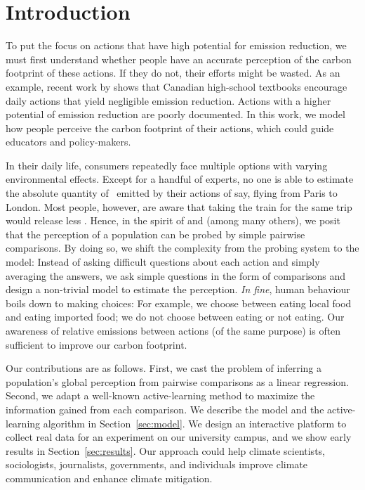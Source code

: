 \section{Introduction}
\label{sec:introduction}
To put the focus on actions that have high potential for emission reduction, we must first understand whether people have an accurate perception of the carbon footprint of these actions.
If they do not, their efforts might be wasted.
As an example, recent work by \citet{wynes2017climate} shows that Canadian high-school textbooks encourage daily actions that yield negligible emission reduction.
Actions with a higher potential of emission reduction are poorly documented.
In this work, we model how people perceive the carbon footprint of their actions, which could guide educators and policy-makers.

In their daily life, consumers repeatedly face multiple options with varying environmental effects.
Except for a handful of experts, no one is able to estimate the absolute quantity of \COtwo\ emitted by their actions of say, flying from Paris to London.
Most people, however, are aware that taking the train for the same trip would release less \COtwo.
Hence, in the spirit of \citet{thurstone1927method} and \citet{salganik2015wiki} (among many others), we posit that the perception of a population can be probed by simple pairwise comparisons.
By doing so, we shift the complexity from the probing system to the model: Instead of asking difficult questions about each action and simply averaging the answers, we ask simple questions in the form of comparisons and design a non-trivial model to estimate the perception.
\textit{In fine}, human behaviour boils down to making choices: For example, we choose between eating local food and eating imported food; we do not choose between eating or not eating.
Our awareness of relative emissions between actions (of the same purpose) is often sufficient to improve our carbon footprint.

Our contributions are as follows.
First, we cast the problem of inferring a population's global perception from pairwise comparisons as a linear regression.
Second, we adapt a well-known active-learning method to maximize the information gained from each comparison.
We describe the model and the active-learning algorithm in Section~\ref{sec:model}.
We design an interactive platform to collect real data for an experiment on our university campus, and we show early results in Section~\ref{sec:results}.
Our approach could help climate scientists, sociologists, journalists, governments, and individuals improve climate communication and enhance climate mitigation.

